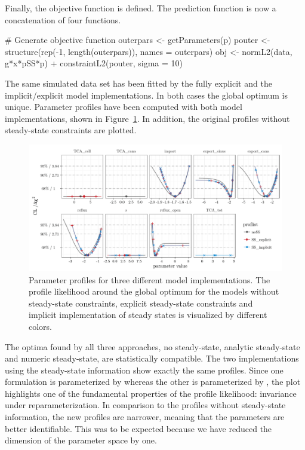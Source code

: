 \documentclass[article]{jss}
\begin{document}
Finally, the objective function is defined. The prediction function is now a concatenation of four functions.

\begin{CodeChunk}
\begin{CodeInput}
# Generate objective function
outerpars <- getParameters(p)
pouter <- structure(rep(-1, length(outerpars)), names = outerpars)
obj <- normL2(data, g*x*pSS*p) + constraintL2(pouter, sigma = 10)
\end{CodeInput}
\end{CodeChunk}

The same simulated data set has been fitted by the fully explicit and the implicit/explicit model implementations. In both cases the global optimum is unique. Parameter profiles have been computed with both model implementations, shown in Figure~\ref{fig:allprofiles}. In addition, the original profiles without steady-state constraints are plotted.
\begin{figure}[ht]
	\centering
	\includegraphics[width = \textwidth]{images/figure8}
	\caption{Parameter profiles for three different model implementations. The profile likelihood around the global optimum for the models without steady-state constraints, explicit steady-state constraints and implicit implementation of steady states is visualized by different colors.}
	\label{fig:allprofiles}
\end{figure}
The optima found by all three approaches, no steady-state, analytic steady-state and numeric steady-state, are statistically compatible. The two implementations using the steady-state information show exactly the same profiles. Since one formulation is parameterized by  whereas the other is parameterized by , the plot highlights one of the fundamental properties of the profile likelihood: invariance under reparameterization. In comparison to the profiles without steady-state information, the new profiles are narrower, meaning that the parameters are better identifiable. This was to be expected because we have reduced the dimension of the parameter space by one.
\end{document}
